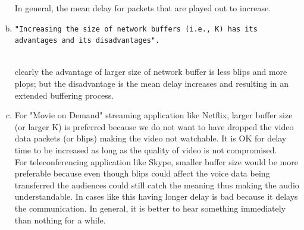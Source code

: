 \documentclass{article}   	                         %
\begin{document}
\begin{enumerate}[(a)]
In general, the mean delay for packets that are played out to increase.
\item
\begin{BVerbatim}
"Increasing the size of network buffers (i.e., K) has its advantages and its disadvantages".
\end{BVerbatim}
\\
clearly the advantage of larger size of network buffer is less blips and more plops; but the disadvantage is the mean delay increases and resulting in an extended buffering process.\\ 
\item
For "Movie on Demand" streaming application like Netflix, larger buffer size (or larger K) is preferred because we do not want to have dropped the video data packets (or blips) making the video not watchable. It is OK for delay time to be increased as long as the quality of video is not compromised.\\
For teleconferencing application like Skype, smaller buffer size would be more preferable because even though blips could affect the voice data being transferred the audiences could still catch the meaning thus making the audio understandable. In cases like this having longer delay is bad because it delays the communication. In general, it is better to hear something immediately than nothing for a while.\\ 
\end{enumerate}
\end{document}
